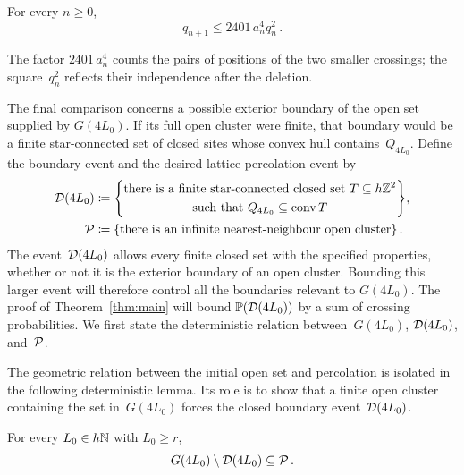 \documentclass[11pt,letterpaper]{article}
\begin{document}
\begin{proposition}
\label{prop:recursion}
For every $n\ge0$,
\begin{equation*}
  q_{n+1}\le2401\,a_n^4q_n^2\,.
\end{equation*}
\end{proposition}

The factor $2401\,a_n^4$ counts the pairs of positions of the two smaller crossings; the square~$q_n^2$ reflects their independence after the deletion.

The final comparison concerns a possible exterior boundary of the open set supplied by $G(4L_0)$. If its full open cluster were finite, that boundary would be a finite star-connected set of closed sites whose convex hull contains~$Q_{4L_0}$. Define the boundary event and the desired lattice percolation event by
\begin{equation}\label{eq:boundary-percolation-events}
  \begin{aligned}
    \mathcal D(4L_0)&\coloneqq\Bigg\{
      \begin{gathered}
        \text{there is a finite star-connected closed set}\ T\subseteq h\mathbb Z^2\\
        \text{such that }Q_{4L_0}\subseteq\operatorname{conv} T
      \end{gathered}
    \Bigg\},\\
    \mathcal P&\coloneqq\{\text{there is an infinite nearest-neighbour open cluster}\}\,.
  \end{aligned}
\end{equation}
The event~$\mathcal D(4L_0)$ allows every finite closed set with the specified properties, whether or not it is the exterior boundary of an open cluster. Bounding this larger event will therefore control all the boundaries relevant to $G(4L_0)$. The proof of Theorem~\ref{thm:main} will bound $\mathbb P(\mathcal D(4L_0))$ by a sum of crossing probabilities. We first state the deterministic relation between~$G(4L_0)$, $\mathcal D(4L_0)$, and~$\mathcal P$.

The geometric relation between the initial open set and percolation is isolated in the following deterministic lemma. Its role is to show that a finite open cluster containing the set in~$G(4L_0)$ forces the closed boundary event~$\mathcal D(4L_0)$.

\begin{lemma}
\label{lem:boundary-reduction}
For every $L_0\in h\mathbb N$ with $L_0\ge r$,
\begin{equation*}
  G(4L_0)\setminus\mathcal D(4L_0)\subseteq\mathcal P\,.
\end{equation*}
\end{lemma}
\end{document}
